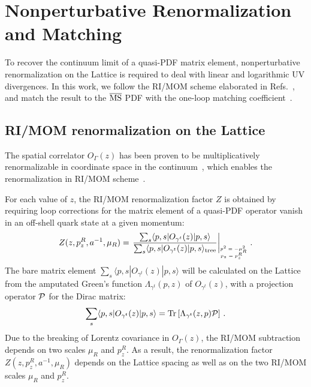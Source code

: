 \section{Nonperturbative Renormalization and Matching}\label{sec:matching}

To recover  the continuum limit of a quasi-PDF matrix element,
nonperturbative renormalization on the Lattice is required to  deal with linear and logarithmic UV divergences. In this work, we follow the RI/MOM scheme elaborated in Refs.~\cite{Stewart:2017tvs,Chen:2017mzz}, and match the result to the $\overline{\rm MS}$ PDF with the one-loop matching coefficient~\cite{Stewart:2017tvs}.

\subsection{RI/MOM renormalization on the Lattice}

The spatial correlator $O_\Gamma(z)$ has been proven to be multiplicatively renormalizable in coordinate space in the continuum~\cite{Ji:2017oey,Ishikawa:2017faj}, which enables  the renormalization in   RI/MOM scheme~\cite{Martinelli:1994ty}.

For each value of $z$, the RI/MOM renormalization factor $Z$ is obtained by requiring loop corrections for the matrix element of a quasi-PDF operator vanish in an off-shell quark state at a given momentum:
\begin{align}\label{eq:Z}
Z(z,p^R_z,a^{-1},\mu_R)=\left.\frac{\sum_s\langle p,s|O_{\gamma^t}(z)|p,s\rangle}{\sum_s\langle p,s|O_{\gamma^t}(z)|p,s\rangle_{\rm tree}}\right|_{\tiny\begin{matrix}p^2=-\mu_R^2 \\ \!\!\!\!p_z=p^R_z\end{matrix}}\,.
\end{align}
The bare matrix element $\sum_s\langle p,s|O_{\gamma^t}(z)|p,s\rangle$ will be calculated on the Lattice from the amputated Green's function $\Lambda_{\gamma^t}(p,z)$ of $O_{\gamma^t}(z)$,  with a projection operator ${\cal P}$ for the Dirac matrix:
\begin{equation}
\sum_s\langle p,s|O_{\gamma^t}(z)|p,s\rangle = \mbox{Tr}\left[ \Lambda_{\gamma^t}(z,p){\cal P}\right]\,.
\end{equation}
Due to the breaking of Lorentz covariance in $O_\Gamma(z)$, the RI/MOM subtraction  depends on  two scales $\mu_R$ and $p_z^R$. As a result, the renormalization factor $Z(z,p^R_z,a^{-1},\mu_R)$ depends on the Lattice spacing as well as on the two RI/MOM scales $\mu_R$ and $p^R_z$.

